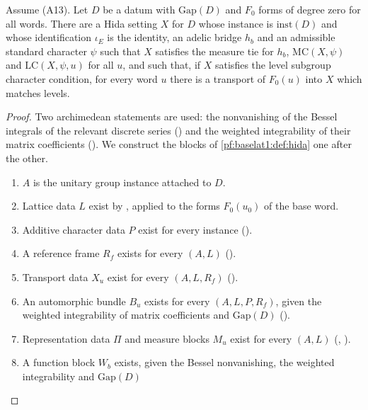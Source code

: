 \begin{theorem}\label{pf:baselat1:setting}
Assume (A13). Let $D$ be a datum with $\mathrm{Gap}(D)$ and $F_0$ forms of degree zero for all words. There are a Hida
setting $X$ for $D$ whose instance is $\mathrm{inst}(D)$ and whose identification $\iota_E$ is the identity, an adelic bridge
$h_b$ and an admissible standard character $\psi$ such that $X$ satisfies the measure tie for $h_b$, $\mathrm{MC}(X,\psi)$
and $\mathrm{LC}(X,\psi,u)$ for all $u$, and such that, if $X$ satisfies the level subgroup character condition, for every word $u$
there is a transport of $F_0(u)$ into $X$ which matches levels.
\end{theorem}

\begin{proof}
Two archimedean statements are used: the nonvanishing of the Bessel integrals of the relevant discrete series
() and the weighted integrability of their matrix coefficients
(). We construct the blocks of
\cref{pf:baselat1:def:hida} one after the other.
\begin{enumerate}[label=(\arabic*)]
\item $A$ is the unitary group instance attached to $D$.
\item Lattice data $L$ exist by , applied to the forms $F_0(u_0)$ of
  the base word.
\item Additive character data $P$ exist for every instance ().
\item A reference frame $R_f$ exists for every $(A,L)$ ().
\item Transport data $X_u$ exist for every $(A,L,R_f)$ ().
\item An automorphic bundle $B_u$ exists for every $(A,L,P,R_f)$, given the weighted integrability of matrix
  coefficients and $\mathrm{Gap}(D)$ ().
\item Representation data $\Pi$ and measure blocks $M_u$ exist for every $(A,L)$
  (, ).
\item A function block $W_b$ exists, given the Bessel nonvanishing, the weighted integrability and $\mathrm{Gap}(D)$

\end{enumerate}
\end{proof}
